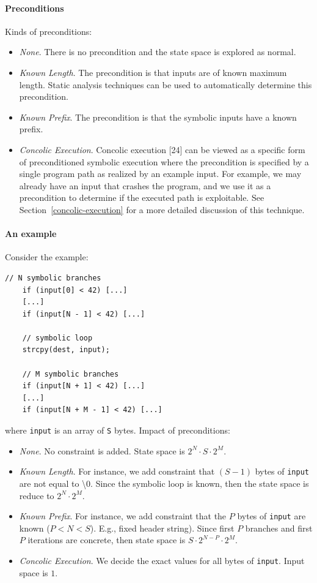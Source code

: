 \paragraph{Preconditions} Kinds of preconditions:
\begin{itemize}
  \item {\em None}. There is no precondition and the state space is explored as normal.
  \item {\em Known Length}. The precondition is that inputs are of known maximum length. Static analysis techniques can be used to automatically determine this precondition.
  \item {\em Known Prefix}. The precondition is that the symbolic inputs have a known prefix.
  \item {\em Concolic Execution}. Concolic execution [24] can be viewed as a specific form of preconditioned symbolic execution where the precondition is specified by a single program path as realized by an example input. For example, we may already have an input that crashes the program, and we use it as a precondition to determine if the executed path is exploitable. See Section~\ref{concolic-execution} for a more detailed discussion of this technique.
\end{itemize}

\paragraph{An example} Consider the example:

\begin{lstlisting}[basicstyle=\ttfamily\small]
    // N symbolic branches 
    if (input[0] < 42) [...]
    [...]
    if (input[N - 1] < 42) [...]

    // symbolic loop
    strcpy(dest, input); 

    // M symbolic branches
    if (input[N + 1] < 42) [...]
    [...]
    if (input[N + M - 1] < 42) [...]
    \end{lstlisting}
where {\tt input} is an array of {\tt S} bytes. Impact of preconditions:
\begin{itemize}
  \item {\em None}. No constraint is added. State space is $2^N \cdot S \cdot 2^M$.
  \item {\em Known Length}. For instance, we add constraint that $(S - 1)$ bytes of {\tt input} are not equal to \textbackslash0. Since the symbolic loop is known, then the state space is reduce to $2^N \cdot 2^M$.
  \item {\em Known Prefix}. For instance, we add constraint that the $P$ bytes of {\tt input} are known ($P < N < S$). E.g., fixed header string). Since first $P$ branches and first $P$ iterations are concrete, then state space is $S \cdot 2^{N-P} \cdot 2^M$.
  \item {\em Concolic Execution}. We decide the exact values for all bytes of {\tt input}. Input space is $1$.
\end{itemize}

